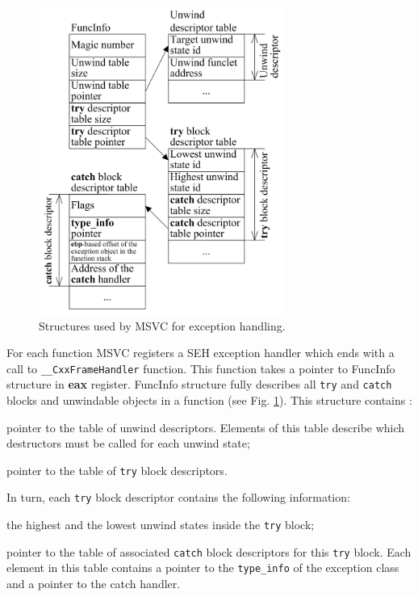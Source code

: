 \documentclass[times, 10pt,twocolumn]{article}
\renewcommand{\~}{{\raise.35ex\hbox{$\scriptstyle\sim$}}}
\renewenvironment{itemize}{
    \begin{list}{\labelitemi}{\itemsep=-\parsep}
}{
	\end{list}
}
\begin{document}
\begin{figure}[tb!]
\centering
  \includegraphics[width=8.0cm]{images/msvce}
\caption{Structures used by MSVC for exception handling.}
\label{fig:msvce}
\end{figure}

For each function MSVC registers a SEH exception handler which ends with a call to
\lstinline{__CxxFrameHandler} function. This function takes a pointer to
FuncInfo structure in \textbf{eax} register. FuncInfo structure fully describes
all \lstinline{try} and \lstinline{catch} blocks and unwindable objects in a function 
(see Fig. \ref{fig:msvce}). 
This structure contains \cite{skochinsky06e}:
\begin{itemize}
\item pointer to the table of unwind descriptors. Elements of this table describe which destructors
    must be called for each unwind state;
\item pointer to the table of \lstinline{try} block descriptors.
\end{itemize}

In turn, each \lstinline{try} block descriptor contains the following information:
\begin{itemize}
\item the highest and the lowest unwind states inside the \lstinline{try} block;
\item pointer to the table of associated \lstinline{catch} block descriptors for 
    this \lstinline{try} block. 
    Each element in this table contains a pointer to the \lstinline{type_info} 
    of the exception class and a pointer to the catch handler.
\end{itemize}
\end{document}
